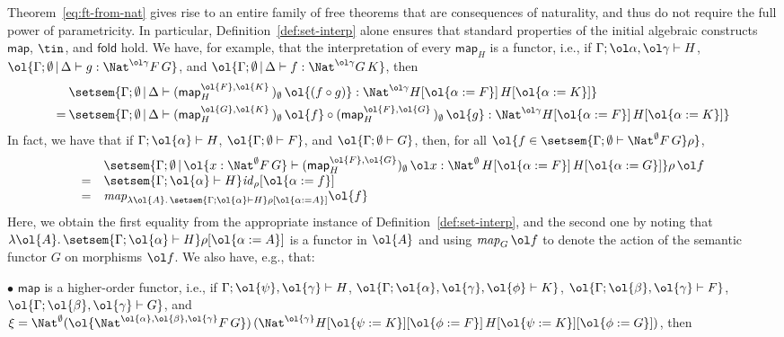 \documentclass{lmcs}
\theoremstyle{plain}\newtheorem{satz}[thm]{Satz}
\newcommand{\fold}{\mathsf{fold}}
\renewcommand{\id}{\mathit{id}}
\newcommand{\map}{\mathsf{map}}
\begin{document}
Theorem~\ref{eq:ft-from-nat} gives rise to an entire family of free
theorems that are consequences of naturality, and thus do not require
the full power of parametricity. In particular,
Definition~\ref{def:set-interp} alone ensures that standard properties
of the initial algebraic constructs $\map$, $\tin$, and $\fold$
hold. We have, for example, that the interpretation of every $\map_H$
is a functor, i.e., if $\Gamma; \ol\alpha, \ol\gamma \vdash H$,
$\ol{\Gamma; \emptyset \,|\, \Delta \vdash g : \Nat^{\ol\gamma} F \,
  G}$, and $\ol{\Gamma; \emptyset \,|\, \Delta \vdash f :
  \Nat^{\ol\gamma} G \, K}$, then
  \begin{align*}
&\setsem{
\Gamma; \emptyset \,|\, \Delta \vdash 
  (\map^{\ol{F}, \ol{K}}_H \,)_{\emptyset} \, \ol{(f \circ g)}
  : \Nat^{\ol\gamma} H[\ol{\alpha := F}] \, H[\ol{\alpha := K}]} \\ 
= \hspace{0.03in} 
  &\setsem{
  \Gamma; \emptyset \,|\, \Delta \vdash 
  (\map^{\ol{G}, \ol{K}}_H \,)_{\emptyset} \, \ol{f} \circ 
  (\map^{\ol{F}, \ol{G}}_H \,)_{\emptyset} \, \ol{g}
  : \Nat^{\ol\gamma} H[\ol{\alpha := F}] \, H[\ol{\alpha := K}]}
\end{align*}
In fact, we have that if $\Gamma; \ol{\alpha} \vdash H$, $\ol{\Gamma;
  \emptyset \vdash F}$, and $\ol{\Gamma; \emptyset \vdash G}$, then,
for all $\ol{f \in \setsem{\Gamma;\emptyset \vdash \Nat^\emptyset
    F\,G}\rho}$,
\[\begin{array}{rl}
&\setsem{ \Gamma;\emptyset\,|\,\ol{x : \Nat^\emptyset F \, G}
  \vdash (\map^{\ol{F},\ol{G}}_H)_\emptyset\,\ol x :
  \Nat^{\emptyset}\,H[\ol{\alpha := F}]\,H[\ol{\alpha := G}]}
\rho\,\ol f\\ =& \setsem{\Gamma; \ol{\alpha}\vdash H}
\id_{\rho}[\ol{\alpha := f}] \\ =&
\mathit{map}_{\lambda \ol{A}.\,\setsem{\Gamma; \ol{\alpha}\vdash H} \rho [\ol{\alpha := A}]} \ol{f} \\
\end{array}\]
Here, we obtain the first equality from the appropriate instance of
Definition~\ref{def:set-interp}, and the second one by noting that
$\lambda \ol{A}.\,\setsem{\Gamma; \ol{\alpha}\vdash H} \rho
[\ol{\alpha := A}]$ is a functor in $\ol{A}$ and using
$\mathit{map}_G\,\ol f$ to denote the action of the semantic functor
$G$ on morphisms $\ol f$. We also have, e.g., that:

\vspace*{0.1in}

\noindent
$\bullet$\; $\map$ is a higher-order functor, i.e., if $\Gamma;
\ol{\psi}, \ol{\gamma} \vdash H$,\; $\ol{\Gamma; \ol{\alpha},
  \ol{\gamma}, \ol{\phi} \vdash K}$,\; $\ol{\Gamma; \ol{\beta},
  \ol{\gamma} \vdash F}$,\; $\ol{\Gamma; \ol{\beta}, \ol{\gamma}
  \vdash G}$, and $\xi = \Nat^{\emptyset} (\ol{\Nat^{\ol{\alpha},
    \ol{\beta}, \ol{\gamma}} F\, G})\, (\Nat^{\ol{\gamma}} H[\ol{\psi
    := K}][\ol{\phi := F}]\, H[\ol{\psi := K}][\ol{\phi := G}])$, then
\end{document}
